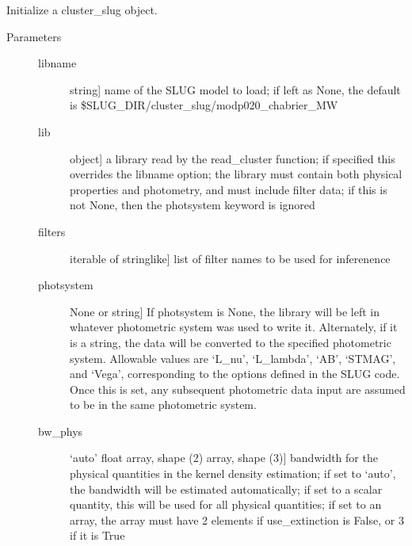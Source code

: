\documentclass[letterpaper,10pt,english]{sphinxmanual}
\begin{document}
\begin{fulllineitems}
\begin{description}
\end{description}

\begin{fulllineitems}
\label{\detokenize{cluster_slug:slugpy.cluster_slug.cluster_slug.__init__}}
Initialize a cluster\_slug object.
\begin{description}
\item[{Parameters}] \leavevmode\begin{description}
\item[{libname}] \leavevmode{[}string{]}
name of the SLUG model to load; if left as None, the default
is \$SLUG\_DIR/cluster\_slug/modp020\_chabrier\_MW

\item[{lib}] \leavevmode{[}object{]}
a library read by the read\_cluster function; if specified
this overrides the libname option; the library must
contain both physical properties and photometry, and
must include filter data; if this is not None, then the 
photsystem keyword is ignored

\item[{filters}] \leavevmode{[}iterable of stringlike{]}
list of filter names to be used for inferenence

\item[{photsystem}] \leavevmode{[}None or string{]}
If photsystem is None, the library will be left in
whatever photometric system was used to write
it. Alternately, if it is a string, the data will be
converted to the specified photometric system. Allowable
values are ‘L\_nu’, ‘L\_lambda’, ‘AB’, ‘STMAG’, and
‘Vega’, corresponding to the options defined in the SLUG
code. Once this is set, any subsequent photometric data
input are assumed to be in the same photometric system.

\item[{bw\_phys}] \leavevmode{[}‘auto’ \textbar{} float \textbar{} array, shape (2) \textbar{} array, shape (3){]}
bandwidth for the physical quantities in the kernel
density estimation; if set to ‘auto’, the bandwidth will
be estimated automatically; if set to a scalar quantity,
this will be used for all physical quantities; if set to
an array, the array must have 2 elements if
use\_extinction is False, or 3 if it is True


\end{description}
\end{description}
\end{fulllineitems}
\end{fulllineitems}
\end{document}
